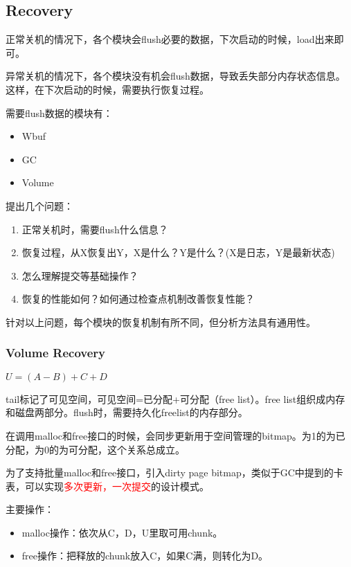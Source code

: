 \documentclass[UTF8]{ctexart}
\begin{document}
\subsection{Recovery}

正常关机的情况下，各个模块会flush必要的数据，下次启动的时候，load出来即可。

异常关机的情况下，各个模块没有机会flush数据，导致丢失部分内存状态信息。
这样，在下次启动的时候，需要执行恢复过程。

需要flush数据的模块有：
\begin{itemize}
    \item Wbuf
    \item GC
    \item Volume
\end{itemize}

提出几个问题：
\begin{tcolorbox}
\begin{enumerate}
    \item 正常关机时，需要flush什么信息？
    \item 恢复过程，从X恢复出Y，X是什么？Y是什么？(X是日志，Y是最新状态)
    \item 怎么理解提交等基础操作？
    \item 恢复的性能如何？如何通过检查点机制改善恢复性能？
\end{enumerate}
\end{tcolorbox}

针对以上问题，每个模块的恢复机制有所不同，但分析方法具有通用性。

\subsubsection{Volume Recovery}

 $U = (A - B) + C + D$

tail标记了可见空间，可见空间=已分配+可分配（free list）。free list组织成内存和磁盘两部分。flush时，需要持久化freelist的内存部分。

在调用malloc和free接口的时候，会同步更新用于空间管理的bitmap。为1的为已分配，为0的为可分配，这个关系总成立。

为了支持批量malloc和free接口，引入dirty page bitmap，类似于GC中提到的卡表，可以实现\textcolor{red}{多次更新，一次提交}的设计模式。

主要操作：
\begin{tcolorbox}
\begin{itemize}
    \item malloc操作：依次从C，D，U里取可用chunk。
    \item free操作：把释放的chunk放入C，如果C满，则转化为D。
\end{itemize}
\end{tcolorbox}
\end{document}

